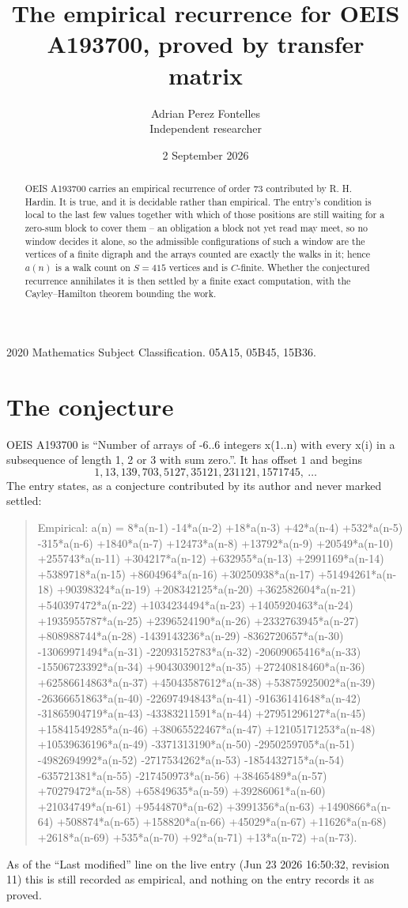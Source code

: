 \documentclass[11pt,a4paper]{article}
\title{The empirical recurrence for OEIS A193700, proved by transfer matrix}
\author{Adrian Perez Fontelles\\ \small Independent researcher}
\date{2 September 2026}
\theoremstyle{plain}
\theoremstyle{definition}
\begin{document}
\maketitle

\begin{abstract}
OEIS A193700 carries an empirical recurrence of order $73$ contributed by R. H. Hardin. It is
true, and it is decidable rather than empirical. The entry's condition is local to the last few values together with which of those positions are still waiting for a zero-sum block to cover them -- an obligation a block not yet read may meet, so no window decides it alone, so
the admissible configurations of such a window are the vertices of a finite digraph and the
arrays counted are exactly the walks in it; hence $a(n)$ is a walk count on $S=415$ vertices
and is $C$-finite. Whether the conjectured recurrence annihilates it is then settled by a
finite exact computation, with the Cayley--Hamilton theorem bounding the work.
\end{abstract}

\noindent\small 2020 Mathematics Subject Classification. 05A15, 05B45, 15B36.\normalsize

\section{The conjecture}

OEIS A193700 is ``Number of arrays of -6..6 integers x(1..n) with every x(i) in a subsequence of length 1, 2 or 3 with sum zero.''. It has offset $1$ and begins
\[
1, 13, 139, 703, 5127, 35121, 231121, 1571745,\ \dots
\]
The entry states, as a conjecture contributed by its author and never marked settled:
\begin{quote}
Empirical: a(n) = 8*a(n-1) -14*a(n-2) +18*a(n-3) +42*a(n-4) +532*a(n-5) -315*a(n-6) +1840*a(n-7) +12473*a(n-8) +13792*a(n-9) +20549*a(n-10) +255743*a(n-11) +304217*a(n-12) +632955*a(n-13) +2991169*a(n-14) +5389718*a(n-15) +8604964*a(n-16) +30250938*a(n-17) +51494261*a(n-18) +90398324*a(n-19) +208342125*a(n-20) +362582604*a(n-21) +540397472*a(n-22) +1034234494*a(n-23) +1405920463*a(n-24) +1935955787*a(n-25) +2396524190*a(n-26) +2332763945*a(n-27) +808988744*a(n-28) -1439143236*a(n-29) -8362720657*a(n-30) -13069971494*a(n-31) -22093152783*a(n-32) -20609065416*a(n-33) -15506723392*a(n-34) +9043039012*a(n-35) +27240818460*a(n-36) +62586614863*a(n-37) +45043587612*a(n-38) +53875925002*a(n-39) -26366651863*a(n-40) -22697494843*a(n-41) -91636141648*a(n-42) -31865904719*a(n-43) -43383211591*a(n-44) +27951296127*a(n-45) +15841549285*a(n-46) +38065522467*a(n-47) +12105171253*a(n-48) +10539636196*a(n-49) -3371313190*a(n-50) -2950259705*a(n-51) -4982694992*a(n-52) -2717534262*a(n-53) -1854432715*a(n-54) -635721381*a(n-55) -217450973*a(n-56) +38465489*a(n-57) +70279472*a(n-58) +65849635*a(n-59) +39286061*a(n-60) +21034749*a(n-61) +9544870*a(n-62) +3991356*a(n-63) +1490866*a(n-64) +508874*a(n-65) +158820*a(n-66) +45029*a(n-67) +11626*a(n-68) +2618*a(n-69) +535*a(n-70) +92*a(n-71) +13*a(n-72) +a(n-73).
\end{quote}
As of the ``Last modified'' line on the live entry (Jun 23 2026 16:50:32, revision 11) this is still
recorded as empirical, and nothing on the entry records it as proved.
\end{document}
